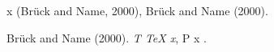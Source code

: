 \documentclass[11pt]{article}
\date{\today}
\title{}
\begin{document}
\tableofcontents

x (Br{\"u}ck {and} \alpha{} Name, 2000), Br{\"u}ck {and} \alpha{} Name (2000).

\noindent
Br{\"u}ck {and} \alpha{} Name (2000). \emph{T {\TeX} \alpha{} x}, P {x} \beta{}.
\end{document}
